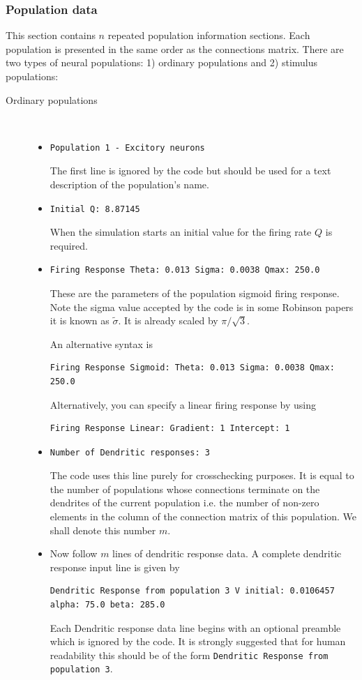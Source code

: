 \documentclass[12pt,a4paper]{article}
\begin{document}
\subsubsection{Population data}
\label{sec:pop}
This section contains $n$ repeated population information sections.
Each population is presented in the same order as the connections matrix.
There are two types of neural populations: 1) ordinary populations
and 2) stimulus populations:
\begin{description}
\item[Ordinary populations]\ \\

	\begin{itemize}
	\item
	\begin{lstlisting}
Population 1 - Excitory neurons
	\end{lstlisting}
	The first line is ignored by the code but should be used for a text description of the population's name.
	\item
	\begin{lstlisting}
Initial Q: 8.87145
	\end{lstlisting}
	When the simulation starts an initial value for the firing rate $Q$ is required.
	\item
	\begin{lstlisting}
Firing Response Theta: 0.013 Sigma: 0.0038 Qmax: 250.0
	\end{lstlisting}
	These are the parameters of the population sigmoid firing response. Note the sigma value accepted by the code is in some Robinson papers it is known as $\tilde{\sigma}$. It is already scaled  by $\pi / \sqrt{3}$.

	An alternative syntax is
	\begin{lstlisting}
Firing Response Sigmoid: Theta: 0.013 Sigma: 0.0038 Qmax: 250.0
	\end{lstlisting}
	Alternatively, you can specify a linear firing response by using
	\begin{lstlisting}
Firing Response Linear: Gradient: 1 Intercept: 1
	\end{lstlisting}
	\item
	\begin{lstlisting}
Number of Dendritic responses: 3
	\end{lstlisting}
	The code uses this line purely for crosschecking purposes. It is equal to the number of populations whose connections terminate on the dendrites of the current population i.e. the number of non-zero elements in the column of the connection matrix of this population. We shall denote this number $m$.
	\item Now follow $m$ lines of dendritic response data. A complete dendritic response input line is given by
	\begin{lstlisting}
Dendritic Response from population 3 V initial: 0.0106457 alpha: 75.0 beta: 285.0
	\end{lstlisting}
	Each Dendritic response data line begins with an optional preamble which is ignored by the code. It is strongly suggested that for human readability this should be of the form {\tt \small Dendritic Response from population 3}.


\end{itemize}
\end{description}
\end{document}
